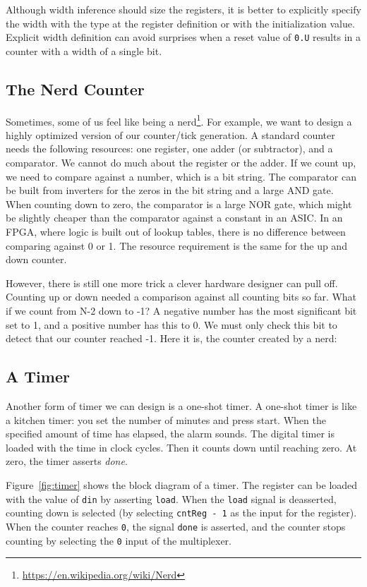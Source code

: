 \documentclass[%
    10pt,
    headinclude, footexclude,
    openright, %
    notitlepage,
    cleardoubleempty,
    headsepline,
    pointlessnumbers,
    bibtotoc, idxtotoc,
    ]{scrbook}
\newcommand{\code}[1]{{\lstinline[basicstyle=\small\ttfamily]{#1}}}
\newcommand{\myref}[2]{\href{#1}{#2}}
\renewcommand{\myref}[2]{{#2}{\footnote{\url{#1}}}}
\begin{document}
Although width inference should size the registers, it is better to explicitly
specify the width with the type at the register definition or with the
initialization value. Explicit width definition can avoid surprises when a reset value of \code{0.U}
results in a counter with a width of a single bit.

\subsection{The Nerd Counter}

Sometimes, some of us feel like being a \myref{https://en.wikipedia.org/wiki/Nerd}{nerd}.
For example, we want to design a highly optimized version of our counter/tick generation.
A standard counter needs the following resources: one register, one adder (or subtractor),
and a comparator. We cannot do much about the register or the adder. If we count
up, we need to compare against a number, which is a bit string. The comparator
can be built from inverters for the zeros in the bit string and a large AND gate.
When counting down to zero, the comparator is a large NOR gate, which might be
slightly cheaper than the comparator against a constant in an ASIC.
In an FPGA, where logic is built out of lookup tables, there is no difference between comparing
against 0 or 1. The resource requirement is the same for the up and down counter.

However, there is still one more trick a clever hardware designer can pull off.
Counting up or down needed a comparison against all counting bits so far.
What if we count from N-2 down to -1? A negative number has the most significant bit
set to 1, and a positive number has this to 0. We must only check this bit to detect
that our counter reached -1. Here it is, the counter created by a nerd:



\subsection{A Timer}

Another form of timer we can design is a one-shot timer. A one-shot timer is like a
kitchen timer: you set the number of minutes and press start. When the specified amount
of time has elapsed, the alarm sounds.
The digital timer is loaded with the time in clock cycles.
Then it counts down until reaching zero. At zero, the timer asserts \emph{done}.

Figure~\ref{fig:timer} shows the block diagram of a timer. The register can be loaded with
the value of \code{din} by asserting \code{load}. When the \code{load} signal is deasserted,
counting down is selected (by selecting \code{cntReg - 1} as the input for the register).
When the counter reaches \code{0}, the signal \code{done} is asserted, and the counter stops
counting by selecting the \code{0} input of the multiplexer.
\end{document}
